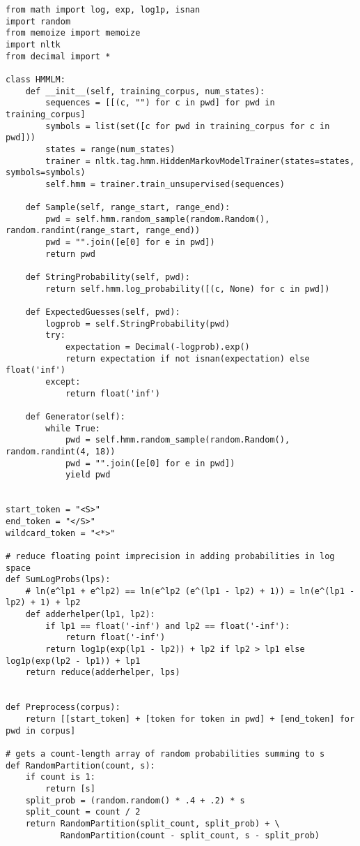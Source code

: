 \documentclass{amsart}
\theoremstyle{definition}
\theoremstyle{remark}
\numberwithin{equation}{section}
\begin{document}
\begin{lstlisting}
from math import log, exp, log1p, isnan
import random
from memoize import memoize
import nltk
from decimal import *

class HMMLM:
    def __init__(self, training_corpus, num_states):
        sequences = [[(c, "") for c in pwd] for pwd in training_corpus]
        symbols = list(set([c for pwd in training_corpus for c in pwd]))
        states = range(num_states)
        trainer = nltk.tag.hmm.HiddenMarkovModelTrainer(states=states, symbols=symbols)
        self.hmm = trainer.train_unsupervised(sequences)

    def Sample(self, range_start, range_end):
        pwd = self.hmm.random_sample(random.Random(), random.randint(range_start, range_end))
        pwd = "".join([e[0] for e in pwd])
        return pwd

    def StringProbability(self, pwd):
        return self.hmm.log_probability([(c, None) for c in pwd])

    def ExpectedGuesses(self, pwd):
        logprob = self.StringProbability(pwd)
        try:
            expectation = Decimal(-logprob).exp()
            return expectation if not isnan(expectation) else float('inf')
        except:
            return float('inf')

    def Generator(self):
        while True:
            pwd = self.hmm.random_sample(random.Random(), random.randint(4, 18))
            pwd = "".join([e[0] for e in pwd])
            yield pwd


start_token = "<S>"
end_token = "</S>"
wildcard_token = "<*>"

# reduce floating point imprecision in adding probabilities in log space
def SumLogProbs(lps):
    # ln(e^lp1 + e^lp2) == ln(e^lp2 (e^(lp1 - lp2) + 1)) = ln(e^(lp1 - lp2) + 1) + lp2
    def adderhelper(lp1, lp2):
        if lp1 == float('-inf') and lp2 == float('-inf'):
            return float('-inf')
        return log1p(exp(lp1 - lp2)) + lp2 if lp2 > lp1 else log1p(exp(lp2 - lp1)) + lp1
    return reduce(adderhelper, lps)
    

def Preprocess(corpus):
    return [[start_token] + [token for token in pwd] + [end_token] for pwd in corpus]

# gets a count-length array of random probabilities summing to s
def RandomPartition(count, s):
    if count is 1:
        return [s]
    split_prob = (random.random() * .4 + .2) * s
    split_count = count / 2
    return RandomPartition(split_count, split_prob) + \
           RandomPartition(count - split_count, s - split_prob)


\end{lstlisting}
\end{document}
